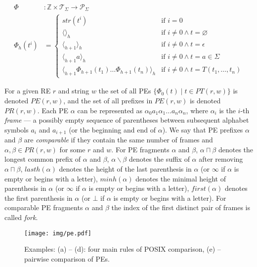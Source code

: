 \documentclass[AMA,STIX1COL]{WileyNJD-v2}
\newcommand{\Xl}{\langle}
\newcommand{\Xr}{\rangle}
\newcommand{\Xm}{\langle\!\rangle}
\newcommand{\XP}{\mathcal{P}}
\newcommand{\XT}{\mathcal{T}}
\newcommand{\YZ}{\mathbb{Z}}
\newcommand{\PE}{P\!E}
\newcommand{\PR}{P\!R}
\begin{document}
    \begin{align*}
    \Phi &: \YZ \times \XT_\Sigma \rightarrow \XP_\Sigma
    \\
    \Phi_{h}(t^{i}) &= \begin{cases}
        str(t^{i})                                            &\text{if } i = 0 \\[-0.2em]
        \Xm_h                                                 &\text{if } i \neq 0 \wedge t = \varnothing \\[-0.2em]
        \Xl_{h+1} \Xr_h                                       &\text{if } i \neq 0 \wedge t = \epsilon \\[-0.2em]
        \Xl_{h+1} a \Xr_h                                     &\text{if } i \neq 0 \wedge t = a \in \Sigma \\[-0.2em]
        \Xl_{h+1} \Phi_{h+1}(t_1) \dots \Phi_{h+1}(t_n) \Xr_h &\text{if } i \neq 0 \wedge t = T(t_1, \dots, t_n)
    \end{cases}
    \end{align*}
    \medskip

For a given RE $r$ and string $w$ the set of all PEs $\big\{ \Phi_{0}(t) \mid t \in PT(r, w) \big\}$ is denoted $\PE(r, w)$,
and the set of all prefixes in $\PE(r, w)$ is denoted $\PR(r, w)$.
Each PE $\alpha$ can be represented as $\alpha_0 a_1 \alpha_1 \dots a_n \alpha_n$,
where $\alpha_i$ is the $i$-th \emph{frame} --- a possibly empty sequence of parentheses between
subsequent alphabet symbols $a_i$ and $a_{i+1}$ (or the beginning and end of $\alpha$).
We say that PE prefixes $\alpha$ and $\beta$ are \emph{comparable}
if they contain the same number of frames and $\alpha, \beta \in \PR(r, w)$ for some $r$ and $w$.
%
For PE fragments $\alpha$ and $\beta$,
$\alpha \sqcap \beta$ denotes the longest common prefix of $\alpha$ and $\beta$,
$\alpha \backslash \beta$ denotes the suffix of $\alpha$ after removing $\alpha \sqcap \beta$,
$lasth(\alpha)$ denotes the height of the last parenthesis in $\alpha$ (or $\infty$ if $\alpha$ is empty or begins with a letter),
$minh(\alpha)$ denotes the minimal height of parenthesis in $\alpha$ (or $\infty$ if $\alpha$ is empty or begins with a letter),
$first(\alpha)$ denotes the first parenthesis in $\alpha$ (or $\bot$ if $\alpha$ is empty or begins with a letter).
For comparable PE fragments $\alpha$ and $\beta$ the index of the first distinct pair of frames is called \emph{fork}.

\begin{figure}\label{fig_pe}
\texttt{[image: img/pe.pdf]}
\vspace{-2em}
\caption{
Examples: (a) -- (d): four main rules of POSIX comparison,
(e) -- pairwise comparison of PEs.
}
\end{figure}
\end{document}
